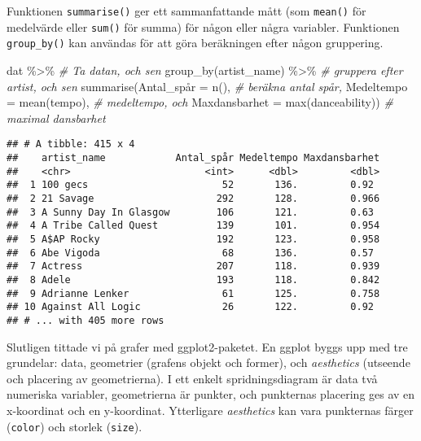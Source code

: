 \documentclass[
]{book}
\newenvironment{Shaded}{\begin{snugshade}}{\end{snugshade}}
\newcommand{\AttributeTok}[1]{\textcolor[rgb]{0.77,0.63,0.00}{#1}}
\newcommand{\CommentTok}[1]{\textcolor[rgb]{0.56,0.35,0.01}{\textit{#1}}}
\newcommand{\FunctionTok}[1]{\textcolor[rgb]{0.00,0.00,0.00}{#1}}
\newcommand{\NormalTok}[1]{#1}
\newcommand{\OtherTok}[1]{\textcolor[rgb]{0.56,0.35,0.01}{#1}}
\newcommand{\SpecialCharTok}[1]{\textcolor[rgb]{0.00,0.00,0.00}{#1}}
\theoremstyle{definition}
\theoremstyle{definition}
\theoremstyle{definition}
\theoremstyle{definition}
\theoremstyle{remark}
\begin{document}
Funktionen \texttt{summarise()} ger ett sammanfattande mått (som \texttt{mean()} för medelvärde eller \texttt{sum()} för summa) för någon eller några variabler. Funktionen \texttt{group\_by()} kan användas för att göra beräkningen efter någon gruppering.

\begin{Shaded}
\begin{Highlighting}[]
\NormalTok{dat }\SpecialCharTok{\%\textgreater{}\%}                                                    \CommentTok{\# Ta datan, och sen}
  \FunctionTok{group\_by}\NormalTok{(artist\_name) }\SpecialCharTok{\%\textgreater{}\%}                                \CommentTok{\# gruppera efter artist, och sen}
  \FunctionTok{summarise}\NormalTok{(Antal\_spår }\OtherTok{=} \FunctionTok{n}\NormalTok{(),                              }\CommentTok{\# beräkna antal spår,}
            \AttributeTok{Medeltempo =} \FunctionTok{mean}\NormalTok{(tempo),                      }\CommentTok{\# medeltempo, och}
            \AttributeTok{Maxdansbarhet =} \FunctionTok{max}\NormalTok{(danceability))             }\CommentTok{\# maximal dansbarhet}
\end{Highlighting}
\end{Shaded}

\begin{verbatim}
## # A tibble: 415 x 4
##    artist_name            Antal_spår Medeltempo Maxdansbarhet
##    <chr>                       <int>      <dbl>         <dbl>
##  1 100 gecs                       52       136.         0.92 
##  2 21 Savage                     292       128.         0.966
##  3 A Sunny Day In Glasgow        106       121.         0.63 
##  4 A Tribe Called Quest          139       101.         0.954
##  5 A$AP Rocky                    192       123.         0.958
##  6 Abe Vigoda                     68       136.         0.57 
##  7 Actress                       207       118.         0.939
##  8 Adele                         193       118.         0.842
##  9 Adrianne Lenker                61       125.         0.758
## 10 Against All Logic              26       122.         0.92 
## # ... with 405 more rows
\end{verbatim}

Slutligen tittade vi på grafer med ggplot2-paketet. En ggplot byggs upp med tre grundelar: data, geometrier (grafens objekt och former), och \emph{aesthetics} (utseende och placering av geometrierna). I ett enkelt spridningsdiagram är data två numeriska variabler, geometrierna är punkter, och punkternas placering ges av en x-koordinat och en y-koordinat. Ytterligare \emph{aesthetics} kan vara punkternas färger (\texttt{color}) och storlek (\texttt{size}).
\end{document}
